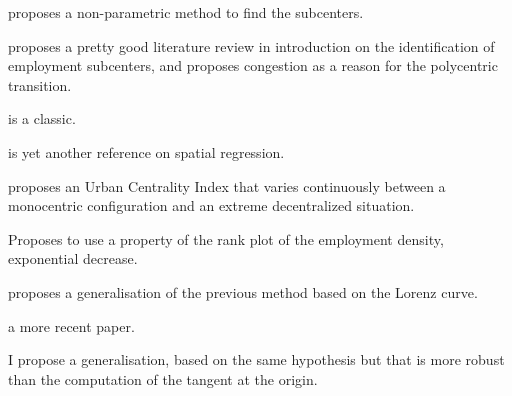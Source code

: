 \cite{McMillen:2001} proposes a non-parametric method to find the subcenters.

\cite{McMillen:2003} proposes a pretty good literature review in introduction on
the identification of employment subcenters, and proposes congestion as a reason
for the polycentric transition.

\cite{Tsai:2005} is a classic.

\cite{Griffith:2007} is yet another reference on spatial regression.

\cite{Pereira:2013} proposes an Urban Centrality Index that varies continuously
between a monocentric configuration and an extreme decentralized situation.

\cite{Louf:2013_polycentric} Proposes to use a property of the rank plot of the
employment density, exponential decrease.

\cite{Louail:2014} proposes a generalisation of the previous method based on the
Lorenz curve.

\cite{LeNechet:2015} a more recent paper.

I propose a generalisation, based on the same hypothesis but that is more robust
than the computation of the tangent at the origin.
